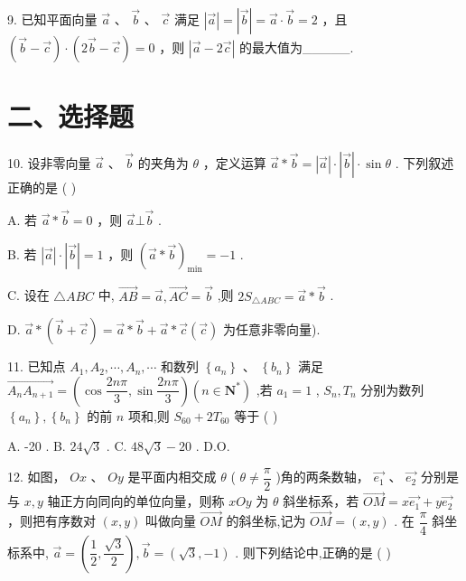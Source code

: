 9. 已知平面向量 $\overrightarrow{a}$ 、 $\overrightarrow{b}$ 、 $\overrightarrow{c}$ 满足 $\left| \overrightarrow{a}\right|  = \left| \overrightarrow{b}\right|  = \overrightarrow{a} \cdot  \overrightarrow{b} = 2$ ，且 $\left( {\overrightarrow{b} - \overrightarrow{c}}\right)  \cdot  \left( {2\overrightarrow{b} - \overrightarrow{c}}\right)  = 0$ ，则 $\left| {\overrightarrow{a} - 2\overrightarrow{c}}\right|$ 的最大值为\_\_\_\_\_.

\section*{二、选择题}

10. 设非零向量 $\overrightarrow{a}$ 、 $\overrightarrow{b}$ 的夹角为 $\theta$ ，定义运算 $\overrightarrow{a} * \overrightarrow{b} = \left| \overrightarrow{a}\right|  \cdot  \left| \overrightarrow{b}\right|  \cdot  \sin \theta$ . 下列叙述正确的是 ( )

A. 若 $\overrightarrow{a} * \overrightarrow{b} = 0$ ，则 $\overrightarrow{a} \bot  \overrightarrow{b}$ .

B. 若 $\left| \overrightarrow{a}\right|  \cdot  \left| \overrightarrow{b}\right|  = 1$ ，则 ${\left( \overrightarrow{a} * \overrightarrow{b}\right) }_{\min } =  - 1$ .

C. 设在 $\bigtriangleup {ABC}$ 中, $\overrightarrow{AB} = \overrightarrow{a},\overrightarrow{AC} = \overrightarrow{b}$ ,则 $2{S}_{\bigtriangleup {ABC}} = \overrightarrow{a} * \overrightarrow{b}$ .

D. $\overrightarrow{a} * \left( {\overrightarrow{b} + \overrightarrow{c}}\right)  = \overrightarrow{a} * \overrightarrow{b} + \overrightarrow{a} * \overrightarrow{c}\left( \overrightarrow{c}\right)$ 为任意非零向量).

11. 已知点 ${A}_{1},{A}_{2},\cdots ,{A}_{n},\cdots$ 和数列 $\left\{  {a}_{n}\right\}$ 、 $\left\{  {b}_{n}\right\}$ 满足 $\overrightarrow{{A}_{n}{A}_{n + 1}} = \left( {\cos \dfrac{2n\pi }{3},\sin \dfrac{2n\pi }{3}}\right) \left( {n \in  {\mathbf{N}}^{ * }}\right)$ ,若 ${a}_{1} = 1$ , ${S}_{n},{T}_{n}$ 分别为数列 $\left\{  {a}_{n}\right\}  ,\left\{  {b}_{n}\right\}$ 的前 $n$ 项和,则 ${S}_{60} + 2{T}_{60}$ 等于 ( )

A. -20 . B. ${24}\sqrt{3}$ . C. ${48}\sqrt{3} - {20}$ . D.O.

12. 如图， ${Ox}$ 、 ${Oy}$ 是平面内相交成 $\theta$ ( $\theta  \neq  \dfrac{\pi }{2}$ )角的两条数轴， $\overrightarrow{{e}_{1}}$ 、 $\overrightarrow{{e}_{2}}$ 分别是与 $x,y$ 轴正方向同向的单位向量，则称 ${xOy}$ 为 $\theta$ 斜坐标系，若 $\overrightarrow{OM} = x\overrightarrow{{e}_{1}} + y\overrightarrow{{e}_{2}}$ ，则把有序数对 $\left( {x,y}\right)$ 叫做向量 $\overrightarrow{OM}$ 的斜坐标,记为 $\overrightarrow{OM} = \left( {x,y}\right)$ . 在 $\dfrac{\pi }{4}$ 斜坐标系中, $\overrightarrow{a} = \left( {\dfrac{1}{2},\dfrac{\sqrt{3}}{2}}\right) ,\overrightarrow{b} = \left( {\sqrt{3}, - 1}\right)$ . 则下列结论中,正确的是 ( )

